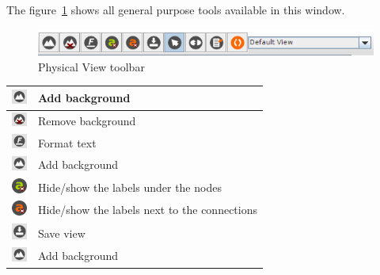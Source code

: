 \documentclass[a4paper]{article}
\begin{document}
		The figure~\ref{fig:default_view_toolbar} shows all general purpose tools available in this window.
		\begin{figure}[h!]
			\centering
			\includegraphics[width=0.6\linewidth]{img/default_view_toolbar.png}
			\caption{Physical View toolbar}
			\label{fig:default_view_toolbar}
		\end{figure}
		
		\begin{table}[h!]
			\centering
			\begin{tabular}[h!]{lp{10cm}}
				\includegraphics[width=0.5cm]{img/icon_add_background.png} & Add background\\
				\midrule
				\includegraphics[width=0.5cm]{img/icon_remove_background.png} & Remove background\\
				\midrule
				\includegraphics[width=0.5cm]{img/icon_format_text.png} & Format text\\
				\midrule
				\includegraphics[width=0.5cm]{img/icon_add_background.png} & Add background\\
				\midrule
				\includegraphics[width=0.5cm]{img/icon_toggle_node_labels.png} & Hide/show the labels under the nodes\\
				\midrule
				\includegraphics[width=0.5cm]{img/icon_toggle_conn_labels.png} & Hide/show the labels next to the connections\\
				\midrule
				\includegraphics[width=0.5cm]{img/icon_save.png} & Save view\\
				\midrule
				\includegraphics[width=0.5cm]{img/icon_add_background.png} & Add background\\

\end{tabular}
\end{table}
\end{document}
